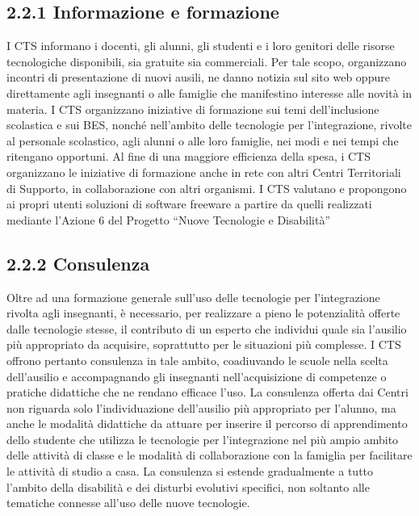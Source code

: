 \subsection*{2.2.1 Informazione e formazione}
I CTS informano i docenti, gli alunni, gli studenti e i loro genitori delle risorse tecnologiche disponibili, sia
gratuite sia commerciali. Per tale scopo, organizzano incontri di presentazione di nuovi ausili, ne danno
notizia sul sito web oppure direttamente agli insegnanti o alle famiglie che manifestino interesse alle novità
in materia.
I CTS organizzano iniziative di formazione sui temi dell'inclusione scolastica e sui BES, nonché nell'ambito
delle tecnologie per l'integrazione, rivolte al personale scolastico, agli alunni o alle loro famiglie, nei modi e
nei tempi che ritengano opportuni.
Al fine di una maggiore efficienza della spesa, i CTS organizzano le iniziative di formazione anche in rete
con altri Centri Territoriali di Supporto, in collaborazione con altri organismi.
I CTS valutano e propongono ai propri utenti soluzioni di software freeware a partire da quelli realizzati
mediante l'Azione 6 del Progetto “Nuove Tecnologie e Disabilità”
\subsection*{2.2.2 Consulenza}
Oltre ad una formazione generale sull'uso delle tecnologie per l'integrazione rivolta agli insegnanti, è
necessario, per realizzare a pieno le potenzialità offerte dalle tecnologie stesse, il contributo di un esperto che
individui quale sia l'ausilio più appropriato da acquisire, soprattutto per le situazioni più complesse. I CTS
offrono pertanto consulenza in tale ambito, coadiuvando le scuole nella scelta dell'ausilio e accompagnando
gli insegnanti nell'acquisizione di competenze o pratiche didattiche che ne rendano efficace l'uso.
La consulenza offerta dai Centri non riguarda solo l'individuazione dell'ausilio più appropriato per l'alunno,
ma anche le modalità didattiche da attuare per inserire il percorso di apprendimento dello studente che
utilizza le tecnologie per l'integrazione nel più ampio ambito delle attività di classe e le modalità di
collaborazione con la famiglia per facilitare le attività di studio a casa.
La consulenza si estende gradualmente a tutto l'ambito della disabilità e dei disturbi evolutivi specifici, non
soltanto alle tematiche connesse all'uso delle nuove tecnologie.
